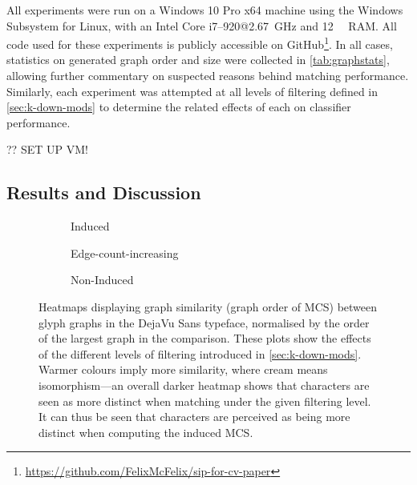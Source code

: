 \documentclass{mpaper}
\begin{document}
\noindent
All experiments were run on a Windows 10 Pro x64 machine using the Windows Subsystem for Linux, with an Intel Core i7--920@\SI{2.67}{\GHz} and \SI{12}{\gibi\byte} RAM.
All code used for these experiments is publicly accessible on GitHub\footnote{\url{https://github.com/FelixMcFelix/sip-for-cv-paper}}.
In all cases, statistics on generated graph order and size were collected in \cref{tab:graphstats}, allowing further commentary on suspected reasons behind matching performance.
Similarly, each experiment was attempted at all levels of filtering defined in \cref{sec:k-down-mods} to determine the related effects of each on classifier performance.


?? SET UP VM!

\subsection{Results and Discussion}


\begin{figure}
	\centering
	\begin{subfigure}[b]{0.3\linewidth}
		
		\caption{
			Induced
			\label{fig:heat:filter:induced}
		}
	\end{subfigure}
	\begin{subfigure}[b]{0.3\linewidth}
		
		\caption{
			Edge-count-increasing
			\label{fig:heat:filter:eci}
		}
	\end{subfigure}
	\begin{subfigure}[b]{0.3\linewidth}
		
		\caption{
			Non-Induced
			\label{fig:heat:filter:non-ind}
		}
	\end{subfigure}

\vspace{0.5em}
\caption{
	Heatmaps displaying graph similarity (graph order of MCS) between glyph graphs in the DejaVu Sans typeface, normalised by the order of the largest graph in the comparison.
	These plots show the effects of the different levels of filtering introduced in \cref{sec:k-down-mods}.
	Warmer colours imply more similarity, where cream means isomorphism---an overall darker heatmap shows that characters are seen as more distinct when matching under the given filtering level.	
	It can thus be seen that characters are perceived as being more distinct when computing the  induced MCS.
	\label{fig:heat:filter}
}
\end{figure}
\end{document}
